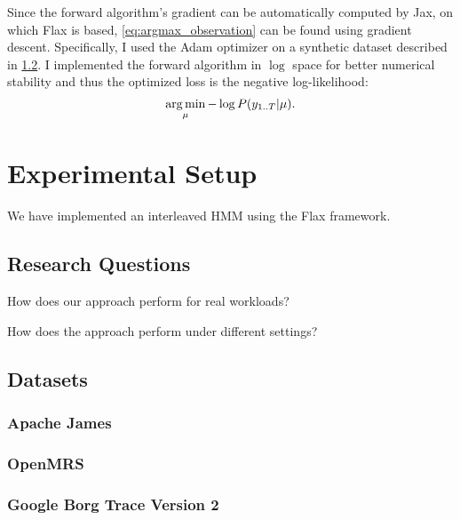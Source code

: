 Since the forward algorithm's gradient can be automatically computed by Jax\cite{Bradbury2018-jz}, on which Flax is based, \cref{eq:argmax_observation} can be found using gradient descent. Specifically, I used the Adam\cite{Kingma2014-jj} optimizer on a synthetic dataset described in \cref{sec:dataset}. I implemented the forward algorithm in \(\log\) space for better numerical stability and thus the optimized loss is the negative log-likelihood:
\begin{equation}
    \label{eq:neg_log_likelihood}
    \operatorname*{arg\,min}_{\mu} - \log P(y_{1..T} | \mu).
\end{equation}

\section{Experimental Setup}\label{sec:experimental_setup}

We have implemented an interleaved HMM using the Flax\cite{Heek2023-nl} framework.


\subsection{Research Questions}

\begin{researchquestions}
    \item\label{rq:performance} How does our approach perform for real workloads?
    \item\label{rq:ablation} How does the approach perform under different settings?
\end{researchquestions}

\subsection{Datasets}\label{sec:dataset}

\subsubsection{Apache James}

\subsubsection{OpenMRS}

\subsubsection{Google Borg Trace Version 2}

